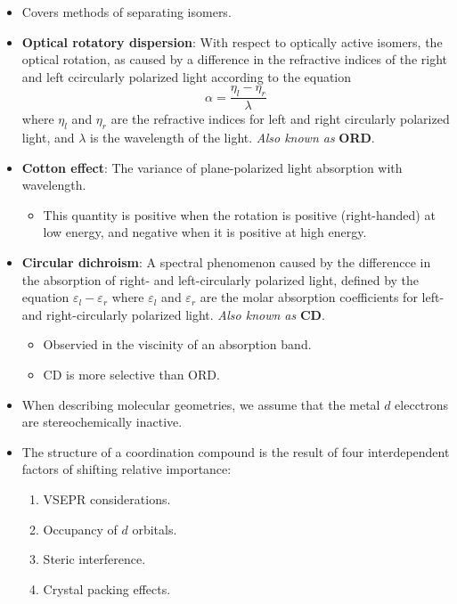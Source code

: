 \documentclass[../notes.tex]{subfiles}
\begin{document}
\begin{itemize}
    \item Covers methods of separating isomers.
    \item \textbf{Optical rotatory dispersion}: With respect to optically active isomers, the optical rotation, as caused by a difference in the refractive indices of the right and left ccircularly polarized light according to the equation
    \begin{equation*}
        \alpha = \frac{\eta_l-\eta_r}{\lambda}
    \end{equation*}
    where $\eta_l$ and $\eta_r$ are the refractive indices for left and right circularly polarized light, and $\lambda$ is the wavelength of the light. \emph{Also known as} \textbf{ORD}.
    \item \textbf{Cotton effect}: The variance of plane-polarized light absorption with wavelength.
    \begin{itemize}
        \item This quantity is positive when the rotation is positive (right-handed) at low energy, and negative when it is positive at high energy.
    \end{itemize}
    \item \textbf{Circular dichroism}: A spectral phenomenon caused by the differencce in the absorption of right- and left-circularly polarized light, defined by the equation $\varepsilon_l-\varepsilon_r$ where $\varepsilon_l$ and $\varepsilon_r$ are the molar absorption coefficients for left- and right-circularly polarized light. \emph{Also known as} \textbf{CD}.
    \begin{itemize}
        \item Observied in the viscinity of an absorption band.
        \item CD is more selective than ORD.
    \end{itemize}
    \item When describing molecular geometries, we assume that the metal $d$ elecctrons are stereochemically inactive.
    \item The structure of a coordination compound is the result of four interdependent factors of shifting relative importance:
    \begin{enumerate}
        \item VSEPR considerations.
        \item Occupancy of $d$ orbitals.
        \item Steric interference.
        \item Crystal packing effects.
        \begin{itemize}[label={\scriptsize$\blacksquare$}]

\end{itemize}
\end{enumerate}
\end{itemize}
\end{document}
